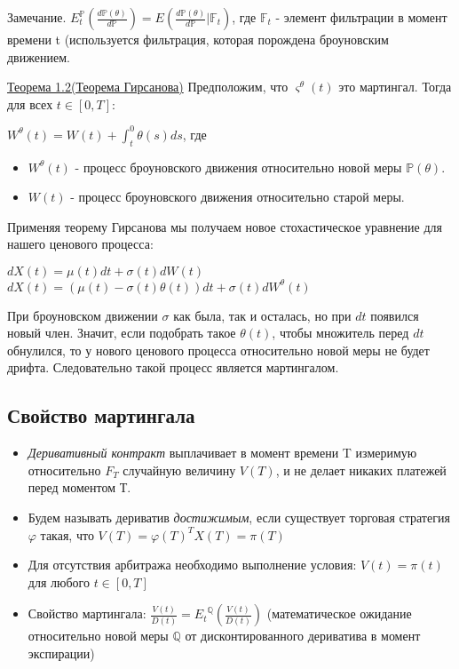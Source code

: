 \documentclass{article}
\begin{document}
Замечание. \(E_t^\mathbb{P}(\frac{d\mathbb{P(\theta)}}{d\mathbb{P}}) = E(\frac{d\mathbb{P(\theta)}}{d\mathbb{P}}|\mathbb{F}_t)\), где \(\mathbb{F}_t\) - элемент фильтрации в момент времени t (используется фильтрация, которая порождена броуновским движением.
\newline

\underline{Теорема 1.2(Теорема Гирсанова)} Предположим, что \(\varsigma^{\theta}\left(t\right)\) это мартингал. Тогда для всех \(t \in [0, T]\):

\(W^{\theta}\left(t\right) = W\left(t\right) + \int_t^0 \theta(s)ds\), где
 \begin{itemize}
     \item \(W^{\theta}\left(t\right)\) - процесс броуновского движения относительно новой меры \(\mathbb{P\left(\theta\right)}\).
     \item \(W\left(t\right)\) - процесс броуновского движения относительно старой меры.
 \end{itemize} 
 
 Применяя теорему Гирсанова мы получаем новое стохастическое уравнение для нашего ценового процесса:
 
 \(dX\left(t\right) = \mu\left(t\right)dt + \sigma\left(t\right)dW\left(t\right)  \)       \Longrightarrow     \(  dX\left(t\right) = (\mu\left(t\right) - \sigma\left(t\right)\theta\left(t\right)) dt + \sigma\left(t\right)dW^\theta\left(t\right)\)
 \newline
 
 При  броуновском движении $\sigma$ как была, так и осталась, но при \(dt\) появился новый член. Значит, если подобрать такое \(\theta\left(t\right)\), чтобы множитель перед \(dt\) обнулился, то у нового ценового процесса относительно новой меры не будет дрифта. Следовательно такой процесс является мартингалом.
 
\subsection{Свойство мартингала}
 \begin{itemize}
     \item \textit{Деривативный контракт} выплачивает в момент времени T измеримую относительно \(F_T\) случайную величину \(V(T)\), и не делает никаких платежей перед моментом Т.
     \item Будем называть дериватив \textit{достижимым}, если существует торговая стратегия \(\varphi\) такая, что \(V(T) = \varphi\left(T\right)^TX\left(T\right) = \pi\left(T\right)\) 
     \item Для отсутствия арбитража необходимо выполнение условия: \(V\left(t\right) = \pi\left(t\right)\) для любого \(t \in [0, T]\)
     \item Свойство мартингала: \(\frac{V\left(t\right)}{D\left(t\right)} = {E_t}^\mathbb{Q}(\frac{V\left(t\right)}{D\left(t\right)})\) (математическое ожидание относительно новой меры \(\mathbb{Q}\) от дисконтированного дериватива в момент экспирации)
 \end{itemize} 
 
\end{document}
